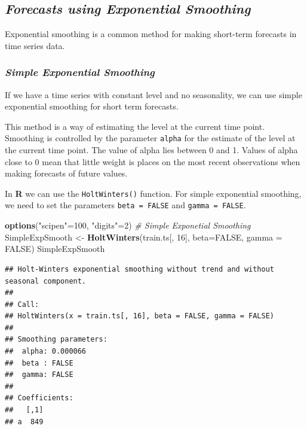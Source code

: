 \documentclass[12pt,openany]{book}
\newenvironment{Shaded}{\begin{snugshade}}{\end{snugshade}}
\newcommand{\CommentTok}[1]{\textcolor[rgb]{0.56,0.35,0.01}{\textit{#1}}}
\newcommand{\DataTypeTok}[1]{\textcolor[rgb]{0.13,0.29,0.53}{#1}}
\newcommand{\DecValTok}[1]{\textcolor[rgb]{0.00,0.00,0.81}{#1}}
\newcommand{\KeywordTok}[1]{\textcolor[rgb]{0.13,0.29,0.53}{\textbf{#1}}}
\newcommand{\NormalTok}[1]{#1}
\newcommand{\OtherTok}[1]{\textcolor[rgb]{0.56,0.35,0.01}{#1}}
\newcommand{\StringTok}[1]{\textcolor[rgb]{0.31,0.60,0.02}{#1}}
\begin{document}
\hypertarget{forecasts-using-exponential-smoothing-1}{%
\subsection{\texorpdfstring{\textbf{\emph{Forecasts using Exponential Smoothing}}}{Forecasts using Exponential Smoothing}}\label{forecasts-using-exponential-smoothing-1}}

Exponential smoothing is a common method for making short-term forecasts in time series data.

\hypertarget{simple-exponential-smoothing-1}{%
\subsubsection{\texorpdfstring{\emph{\textbf{\emph{Simple Exponential Smoothing}}}}{Simple Exponential Smoothing}}\label{simple-exponential-smoothing-1}}

If we have a time series with constant level and no seasonality, we can use simple exponential smoothing for short term forecasts.

This method is a way of estimating the level at the current time point. Smoothing is controlled by the parameter \texttt{alpha} for the estimate of the level at the current time point. The value of alpha lies between 0 and 1. Values of alpha close to 0 mean that little weight is places on the most recent observations when making forecasts of future values.

In \textbf{R} we can use the \texttt{HoltWinters()} function. For simple exponential smoothing, we need to set the parameters \texttt{beta\ =\ FALSE} and \texttt{gamma\ =\ FALSE}.

\begin{Shaded}
\begin{Highlighting}[]
\KeywordTok{options}\NormalTok{(}\StringTok{"scipen"}\NormalTok{=}\DecValTok{100}\NormalTok{, }\StringTok{"digits"}\NormalTok{=}\DecValTok{2}\NormalTok{)}
\CommentTok{# Simple Exponetial Smoothing}
\NormalTok{SimpleExpSmooth <-}\StringTok{ }\KeywordTok{HoltWinters}\NormalTok{(train.ts[, }\DecValTok{16}\NormalTok{], }\DataTypeTok{beta=}\OtherTok{FALSE}\NormalTok{, }\DataTypeTok{gamma =} \OtherTok{FALSE}\NormalTok{)}
\NormalTok{SimpleExpSmooth}
\end{Highlighting}
\end{Shaded}

\begin{verbatim}
## Holt-Winters exponential smoothing without trend and without seasonal component.
## 
## Call:
## HoltWinters(x = train.ts[, 16], beta = FALSE, gamma = FALSE)
## 
## Smoothing parameters:
##  alpha: 0.000066
##  beta : FALSE
##  gamma: FALSE
## 
## Coefficients:
##   [,1]
## a  849
\end{verbatim}
\end{document}
